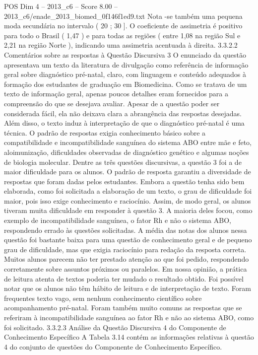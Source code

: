 \begin{textsample}{POS Dim 4 – 2013\_c6 – Score 8.00 – 2013\_c6/enade\_2013\_biomed\_0f146f1ed9.txt}
Nota -se também uma pequena moda secundária no intervalo ( 20 ; 30 ].
O coeficiente de assimetria é positivo para todo o Brasil ( 1,47 ) e para todas as regiões ( entre 1,08 na região Sul e 2,21 na região Norte ), indicando uma assimetria acentuada à direita. 3.3.2.2 Comentários sobre as respostas à Questão Discursiva 3 O enunciado da questão apresentava um texto da literatura de divulgação como referência de informação geral sobre diagnóstico pré-natal, claro, com linguagem e conteúdo adequados à formação dos estudantes de graduação em Biomedicina.
Como se tratava de um texto de informação geral, apenas poucos detalhes eram fornecidos para a compreensão do que se desejava avaliar.
Apesar de a questão poder ser considerada fácil, ela não deixava clara a abrangência das respostas desejadas.
Além disso, o texto induz à interpretação de que o diagnóstico pré-natal é uma técnica.
O padrão de respostas exigia conhecimento básico sobre a compatibilidade e incompatibilidade sanguínea do sistema ABO entre mãe e feto, aloimunização, dificuldades observadas de diagnóstico genético e algumas noções de biologia molecular.
Dentre as três questões discursivas, a questão 3 foi a de maior dificuldade para os alunos.
O padrão de resposta garantiu a diversidade de respostas que foram dadas pelos estudantes.
Embora a questão tenha sido bem elaborada, como foi solicitada a elaboração de um texto, o grau de dificuldade foi maior, pois isso exige conhecimento e raciocínio.
Assim, de modo geral, os alunos tiveram muita dificuldade em responder à questão 3.
A maioria deles focou, como exemplo de incompatibilidade sanguínea, o fator Rh e não o sistema ABO, respondendo errado às questões solicitadas.
A média das notas dos alunos nessa questão foi bastante baixa para uma questão de conhecimento geral e de pequeno grau de dificuldade, mas que exigia raciocínio para redação da resposta correta.
Muitos alunos parecem não ter prestado atenção ao que foi pedido, respondendo corretamente sobre assuntos próximos ou paralelos.
Em nossa opinião, a prática de leitura atenta de textos poderia ter mudado o resultado obtido.
Foi possível notar que os alunos não têm hábito de leitura e de interpretação de texto.
Foram frequentes texto vago, sem nenhum conhecimento científico sobre acompanhamento pré-natal.
Foram também muito comuns as respostas que se referiram à incompatibilidade sanguínea ao fator Rh e não ao sistema ABO, como foi solicitado. 3.3.2.3 Análise da Questão Discursiva 4 do Componente de Conhecimento Específico A Tabela 3.14 contém as informações relativas à questão 4 do conjunto de questões do Componente de Conhecimento Específico.

\end{textsample}
